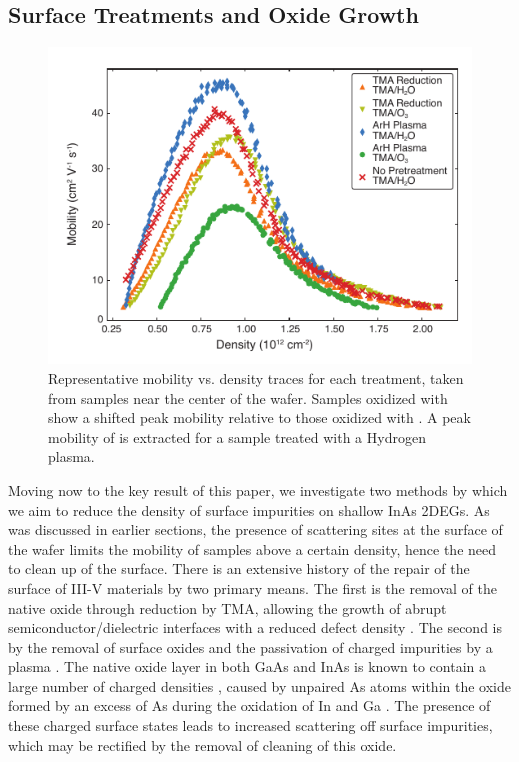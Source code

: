 \subsection{\label{sec:surf_treat}Surface Treatments and Oxide Growth}

\begin{figure}
    \includegraphics[width=0.6\linewidth]{Figure2}
    \caption[Representative mobility and density traces]{\label{fig:surf_fig2} Representative mobility vs. density traces for each treatment, taken from samples near the center of the wafer. Samples oxidized with  show a shifted peak mobility relative to those oxidized with . A peak mobility of  is extracted for a sample treated with a Hydrogen plasma.}
\end{figure}

Moving now to the key result of this paper, we investigate two methods by which we aim to reduce the density of surface impurities on shallow InAs 2DEGs. As was discussed in earlier sections, the presence of scattering sites at the surface of the wafer limits the mobility of samples above a certain density, hence the need to clean up of the surface. There is an extensive history of the repair of the surface of III-V materials by two primary means. The first is the removal of the native oxide through reduction by TMA, allowing the growth of abrupt semiconductor/dielectric interfaces with a reduced defect density \cite{doi:10.1063/1.3148723,Tallarida_2012,CLEVELAND2013167}. The second is by the removal of surface oxides and the passivation of charged impurities by a  plasma \cite{CLEVELAND2013167,BELL1998125,doi:10.1116/1.586538}. The native oxide layer in both GaAs and InAs is known to contain a large number of charged densities \cite{doi:10.1063/1.5054292,PhysRevB.49.11159}, caused by unpaired As atoms within the oxide formed by an excess of As during the oxidation of In and Ga \cite{doi:10.1063/1.3369540,Affentauschegg_2001}. The presence of these charged surface states leads to increased scattering off surface impurities, which may be rectified by the removal of cleaning of this oxide.

